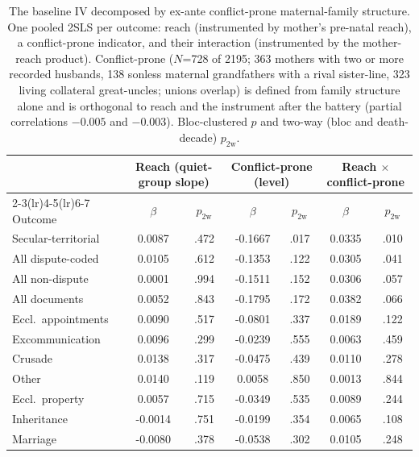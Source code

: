 \documentclass[12pt]{article}
\theoremstyle{definition}
\theoremstyle{remark}
\begin{document}
\begin{table}[t]
\centering
\caption{The baseline IV decomposed by ex-ante conflict-prone maternal-family structure. One pooled 2SLS per outcome: reach (instrumented by mother's pre-natal reach), a conflict-prone indicator, and their interaction (instrumented by the mother-reach product). Conflict-prone ($N$=728 of 2195; 363 mothers with two or more recorded husbands, 138 sonless maternal grandfathers with a rival sister-line, 323 living collateral great-uncles; unions overlap) is defined from family structure alone and is orthogonal to reach and the instrument after the battery (partial correlations $-0.005$ and $-0.003$). Bloc-clustered $p$ and two-way (bloc and death-decade) $p_{2\text{w}}$.}
\label{tab:app_cp2_inter}
\small
\begin{tabular}{lcccccc}
\toprule
 & \multicolumn{2}{c}{Reach (quiet-group slope)} & \multicolumn{2}{c}{Conflict-prone (level)} & \multicolumn{2}{c}{Reach $\times$ conflict-prone} \\
\cmidrule(lr){2-3}\cmidrule(lr){4-5}\cmidrule(lr){6-7}
Outcome & $\beta$ & $p_{2\text{w}}$ & $\beta$ & $p_{2\text{w}}$ & $\beta$ & $p_{2\text{w}}$ \\
\midrule
Secular-territorial & 0.0087 & .472 & -0.1667 & .017 & 0.0335 & .010 \\
All dispute-coded & 0.0105 & .612 & -0.1353 & .122 & 0.0305 & .041 \\
All non-dispute & 0.0001 & .994 & -0.1511 & .152 & 0.0306 & .057 \\
All documents & 0.0052 & .843 & -0.1795 & .172 & 0.0382 & .066 \\
Eccl.\ appointments & 0.0090 & .517 & -0.0801 & .337 & 0.0189 & .122 \\
Excommunication & 0.0096 & .299 & -0.0239 & .555 & 0.0063 & .459 \\
Crusade & 0.0138 & .317 & -0.0475 & .439 & 0.0110 & .278 \\
Other & 0.0140 & .119 & 0.0058 & .850 & 0.0013 & .844 \\
Eccl.\ property & 0.0057 & .715 & -0.0349 & .535 & 0.0089 & .244 \\
Inheritance & -0.0014 & .751 & -0.0199 & .354 & 0.0065 & .108 \\
Marriage & -0.0080 & .378 & -0.0538 & .302 & 0.0105 & .248 \\
\midrule

\end{tabular}
\end{table}
\end{document}
